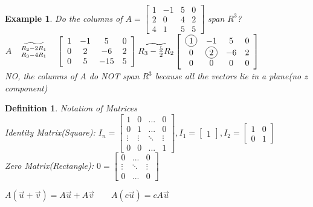 \documentclass[a4paper,12pt,openany]{book}
\newcommand*{\bfrac}[2]{\genfrac{}{}{0pt}{}{#1}{#2}}
\newcommand*\circled[1]{\tikz[baseline=(char.base)]{
            \node[shape=circle,draw,inner sep=2pt] (char) {#1};}}
\theoremstyle{defn}
\newtheorem{defn}{Definition}[section]
\theoremstyle{expl}
\newtheorem{expl}{Example}[section]
\begin{document}
\begin{expl}
\textup{
Do the columns of $A=\left[\begin{array}{cccc}1&-1&5&0\\2&0&4&2\\4&1&5&5\end{array}\right]$ span $R^3$?\\
$A\quad\widetilde{\bfrac{R_2-2R_1}{R_3-4R_1}}\quad\left[\begin{array}{cccc}1&-1&5&0\\0&2&-6&2\\0&5&-15&5\end{array}\right]
\widetilde{R_3-\frac{5}{2}R_2}\left[\begin{array}{cccc}\circled{1}&-1&5&0\\0&\circled{2}&-6&2\\0&0&0&0\end{array}\right]$\\
NO, the columns of $A$ do NOT span $R^3$ because all the vectors lie in a plane(no z component)
}\end{expl}
\begin{defn}\textup{
Notation of Matrices\\
Identity Matrix(Square): $I_n = \left[\begin{array}{cccc}1&0&...&0\\0&1&...&0\\\vdots&\vdots&\ddots&\vdots\\0&0&...&1\end{array}\right],I_1 = \left[\begin{array}{c}1\end{array}\right], I_2 = \left[\begin{array}{cc}1&0\\0&1\end{array}\right]$\\
Zero Matrix(Rectangle): $0 = \left[\begin{array}{ccc}0&...&0\\\vdots&\ddots&\vdots\\0&...&0\end{array}\right]$
}\end{defn}
\noindent$A(\vec{u}+\vec{v})=A\vec{u}+A\vec{v}\qquad A(c\vec{u})=cA\vec{u}$
\end{document}
